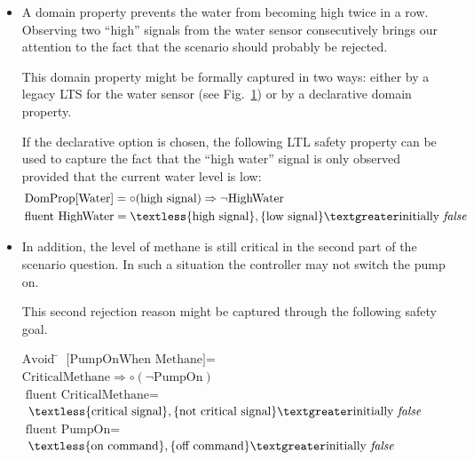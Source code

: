 \begin{itemize}
\item A domain property prevents the water from becoming high twice in a row. Observing two ``high'' signals from the water sensor consecutively brings our attention to the fact that the scenario should probably be rejected.

This domain property might be formally captured in two ways: either by a legacy LTS for the water sensor (see Fig.~\ref{image:minepump-water-sensor-lts}) or by a declarative domain property.
\begin{figure}[H]
\centering
{}
\label{image:minepump-water-sensor-lts}
\end{figure}

If the declarative option is chosen, the following LTL safety property can be used to capture the fact that the ``high water'' signal is only observed provided that the current water level is low:
\begin{align*}
&\mbox{DomProp[Water]} = \circ(\mbox{high signal}) \Rightarrow \neg \mbox{HighWater}\\
&\mbox{fluent HighWater} = \textless \{\mbox{high signal}\}, \{\mbox{low signal}\} \textgreater \mbox{initially \emph{false}}
\end{align*}

\item In addition, the level of methane is still critical in the second part of the scenario question. In such a situation the controller may not switch the pump on.

This second rejection reason might be captured through the following safety goal.
\begin{tabbing}
$\mbox{Avoid}$ \= $\mbox{[PumpOnWhen Methane]} = $ \\
\> $\mbox{CriticalMethane} \Rightarrow \circ(\neg \mbox{PumpOn})$ \\
$\mbox{fluent CriticalMethane} = $ \\
\> $\textless \{\mbox{critical signal}\}, \{\mbox{not critical signal}\} \textgreater\mbox{initially \emph{false}}$ \\
$\mbox{fluent PumpOn} = $ \\
\> $\textless \{\mbox{on command}\}, \{\mbox{off command}\} \textgreater \mbox{initially \emph{false}}$
\end{tabbing}

\end{itemize}

